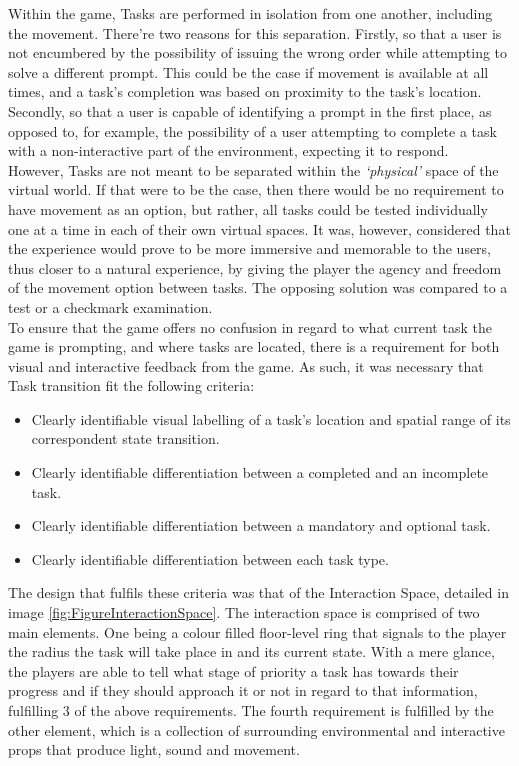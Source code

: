     Within the game, Tasks are performed in isolation from one another, including the movement. There’re two reasons for this separation. Firstly, so that a user is not encumbered by the possibility of issuing the wrong order while attempting to solve a different prompt. This could be the case if movement is available at all times, and a task’s completion was based on proximity to the task’s location. Secondly, so that a user is capable of identifying a prompt in the first place, as opposed to, for example, the possibility of a user attempting to complete a task with a non-interactive part of the environment, expecting it to respond.\\
    However, Tasks are not meant to be separated within the \emph{‘physical’} space of the virtual world. If that were to be the case, then there would be no requirement to have movement as an option, but rather, all tasks could be tested individually one at a time in each of their own virtual spaces. It was, however, considered that the experience would prove to be more immersive and memorable to the users, thus closer to a natural experience, by giving the player the agency and freedom of the movement option between tasks. The opposing solution was compared to a test or a checkmark examination.\\ 
    To ensure that the game offers no confusion in regard to what current task the game is prompting, and where tasks are located, there is a requirement for both visual and interactive feedback from the game. As such, it was necessary that Task transition fit the following criteria:
    
    \begin{itemize}
        \item Clearly identifiable visual labelling of a task’s location and spatial range of its correspondent state transition.
        \item Clearly identifiable differentiation between a completed and an incomplete task.
        \item Clearly identifiable differentiation between a mandatory and optional task.
        \item Clearly identifiable differentiation between each task type.
    \end{itemize}

    The design that fulfils these criteria was that of the Interaction Space, detailed in image \ref{fig:FigureInteractionSpace}. The interaction space is comprised of two main elements. One being a colour filled floor-level ring that signals to the player the radius the task will take place in and its current state. With a mere glance, the players are able to tell what stage of priority a task has towards their progress and if they should approach it or not in regard to that information, fulfilling 3 of the above requirements. The fourth requirement is fulfilled by the other element, which is a collection of surrounding environmental and interactive props that produce light, sound and movement.\\

